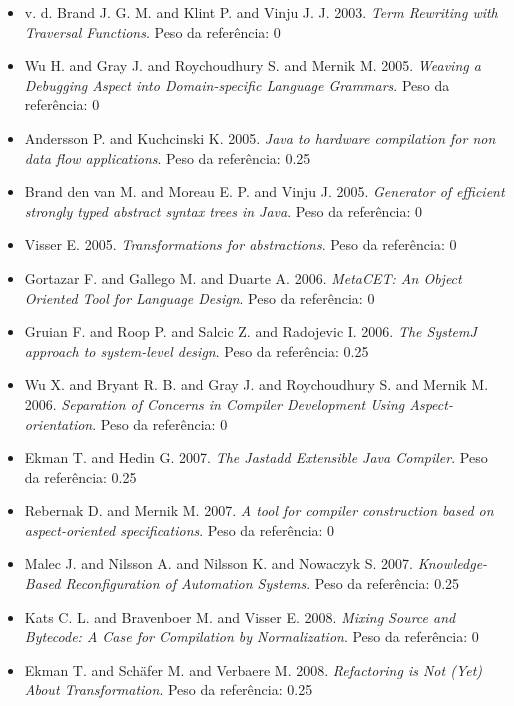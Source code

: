 \begin{itemize}
\item v. d. Brand J. G. M. and Klint P. and Vinju J. J.
      2003.
      {\it Term Rewriting with Traversal Functions}.
      Peso da referência: 0
\item Wu H. and Gray J. and Roychoudhury S. and Mernik M.
      2005.
      {\it Weaving a Debugging Aspect into Domain-specific Language Grammars}.
      Peso da referência: 0
\item Andersson P. and Kuchcinski K.
      2005.
      {\it Java to hardware compilation for non data flow applications}.
      Peso da referência: 0.25
\item Brand den van M. and Moreau E. P. and Vinju J.
      2005.
      {\it Generator of efficient strongly typed abstract syntax trees in Java}.
      Peso da referência: 0
\item Visser E.
      2005.
      {\it Transformations for abstractions}.
      Peso da referência: 0
\item Gortazar F. and Gallego M. and Duarte A.
      2006.
      {\it MetaCET: An Object Oriented Tool for Language Design}.
      Peso da referência: 0
\item Gruian F. and Roop P. and Salcic Z. and Radojevic I.
      2006.
      {\it The SystemJ approach to system-level design}.
      Peso da referência: 0.25
\item Wu X. and Bryant R. B. and Gray J. and Roychoudhury S. and Mernik M.
      2006.
      {\it Separation of Concerns in Compiler Development Using Aspect-orientation}.
      Peso da referência: 0
\item Ekman T. and Hedin G.
      2007.
      {\it The Jastadd Extensible Java Compiler}.
      Peso da referência: 0.25
\item Rebernak D. and Mernik M.
      2007.
      {\it A tool for compiler construction based on aspect-oriented specifications}.
      Peso da referência: 0
\item Malec J. and Nilsson A. and Nilsson K. and Nowaczyk S.
      2007.
      {\it Knowledge-Based Reconfiguration of Automation Systems}.
      Peso da referência: 0.25
\item Kats C. L. and Bravenboer M. and Visser E.
      2008.
      {\it Mixing Source and Bytecode: A Case for Compilation by Normalization}.
      Peso da referência: 0
\item Ekman T. and Sch\"{a}fer M. and Verbaere M.
      2008.
      {\it Refactoring is Not (Yet) About Transformation}.
      Peso da referência: 0.25

\end{itemize}
